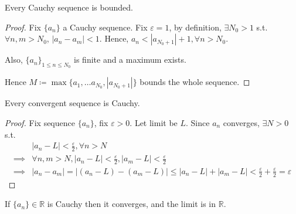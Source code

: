 \begin{theorem}
    Every Cauchy sequence is bounded.
\end{theorem}
\begin{proof}
    Fix $\{ a_n \} $ a Cauchy sequence. 
    Fix $\varepsilon = 1$, by definition, 
    $\exists N_0 > 1$ s.t. $\forall n, m > N_0$,
    $|a_n - a_m| < 1$. 
    Hence, $a_n < |a_{N_0 + 1}| + 1, \forall n > N_0$. 
    \medskip 

    Also, $\{ a_n \}_{1 \leq n \leq N_0} $ is finite 
    and a maximum exists. 
    \medskip

    Hence $M \coloneq \max \{ 
        a_1, \hdots a_{N_0},
        |a_{N_0 + 1}|
    \} 
    $ bounds the whole sequence.
\end{proof}

\begin{theorem}
    Every convergent sequence is Cauchy.
\end{theorem}
\begin{proof}
    Fix sequence $ \{ a_n \} $, fix $ \varepsilon > 0$. Let limit be $L$. 
    Since $a_n$ converges, $\exists N > 0$ s.t. 
    \begin{align*}
        & |a_n - L | < \frac{\varepsilon}{2}, \forall n > N\\
        \implies & \forall n, m > N, |a_n - L| < \frac{\varepsilon}{2}, 
        |a_m - L | < \frac{\varepsilon}{2} \\
        \implies & |a_n - a_m| = 
        |(a_n - L) - (a_m - L)| \leq |a_n - L | + |a_m - L | < 
        \frac{\varepsilon}{2} + 
        \frac{\varepsilon}{2} = \varepsilon
    \end{align*}
\end{proof}


\begin{theorem}
    If $\{ a_n \} \in \mathbb{R}$ is Cauchy then it 
    converges, and the limit is in $\mathbb{R}$. 
\end{theorem}

